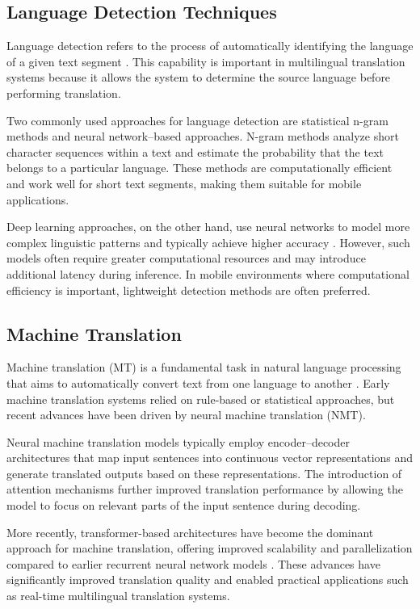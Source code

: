 \subsection{Language Detection Techniques}

Language detection refers to the process of automatically identifying the language of a given text segment \cite{lui2014automatic}. This capability is important in multilingual translation systems because it allows the system to determine the source language before performing translation.

Two commonly used approaches for language detection are statistical n-gram methods and neural network–based approaches. N-gram methods analyze short character sequences within a text and estimate the probability that the text belongs to a particular language. These methods are computationally efficient and work well for short text segments, making them suitable for mobile applications.

Deep learning approaches, on the other hand, use neural networks to model more complex linguistic patterns and typically achieve higher accuracy \cite{gothe2020language}. However, such models often require greater computational resources and may introduce additional latency during inference. In mobile environments where computational efficiency is important, lightweight detection methods are often preferred.

\subsection{Machine Translation}

Machine translation (MT) is a fundamental task in natural language processing that aims to automatically convert text from one language to another \cite{tsujii1986future}. Early machine translation systems relied on rule-based or statistical approaches, but recent advances have been driven by neural machine translation (NMT).

Neural machine translation models typically employ encoder–decoder architectures that map input sentences into continuous vector representations and generate translated outputs based on these representations. The introduction of attention mechanisms further improved translation performance by allowing the model to focus on relevant parts of the input sentence during decoding.

More recently, transformer-based architectures have become the dominant approach for machine translation, offering improved scalability and parallelization compared to earlier recurrent neural network models \cite{kocmi2022findings}. These advances have significantly improved translation quality and enabled practical applications such as real-time multilingual translation systems.

